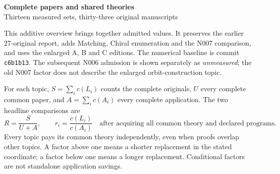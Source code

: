 \documentclass[11pt,a4paper]{article}
\begin{document}
\begin{center}\Large\textbf{Complete papers and shared theories}\\[4pt]
\normalsize Thirteen measured sets, thirty-three original manuscripts\end{center}
This additive overview brings together admitted values. It preserves the earlier 27-original report, adds Matching, Chiral enumeration and the N007 comparison, and uses the enlarged A, B and C editions. The numerical baseline is commit \texttt{c6b1b13}. The subsequent N006 admission is shown separately as \emph{unmeasured}; the old N007 factor does not describe the enlarged orbit-construction topic.

For each topic, $S=\sum_i c(L_i)$ counts the complete originals, $U$ every complete common paper, and $A=\sum_i c(A_i)$ every complete application. The two headline comparisons are
\[
 R=\frac{S}{U+A},\qquad r_i=\frac{c(L_i)}{c(A_i)}
 \quad\text{after acquiring all common theory and declared programs.}
\]
Every topic pays its common theory independently, even when proofs overlap other topics. A factor above one means a shorter replacement in the stated coordinate; a factor below one means a longer replacement. Conditional factors are not standalone application savings.
\end{document}
